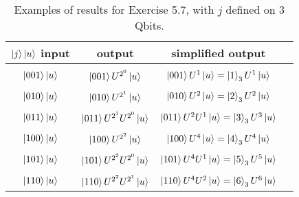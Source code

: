\documentclass{article}
\begin{document}
\begin{enumerate}[label=\textbf{(\arabic*)}]
\begin{table}[th]
    \captionsetup{font=small, width = 14cm}
    \centering
    \begin{tabular}{c|c|c|c}
        $\ket{j}\ket{u}$ input & output & simplified output\\
        \hline\hline
        &&\\[-5pt]
        $\ket{001}\ket{u}$
        & $\ket{001}U^{2^0}\ket{u}$
        & $\ket{001}U^{1}\ket{u} = \ket{1}_3 U^{1}\ket{u}$
        \\[5pt]
        \hline
        &&\\[-5pt]
        $\ket{010}\ket{u}$
        & $\ket{010}U^{2^1}\ket{u}$
        & $\ket{010}U^{2}\ket{u} = \ket{2}_3 U^{2}\ket{u}$
        \\[5pt]
        \hline
        &&\\[-5pt]
        $\ket{011}\ket{u}$
        & $\ket{011}U^{2^1}U^{2^0}\ket{u}$
        & $\ket{011}U^{2}U^{1}\ket{u} = \ket{3}_3 U^{3}\ket{u}$
        \\[5pt]
        \hline
        &&\\[-5pt]
        $\ket{100}\ket{u}$
        & $\ket{100}U^{2^2}\ket{u}$
        & $\ket{100}U^{4}\ket{u} = \ket{4}_3 U^{4}\ket{u}$
        \\[5pt]
        \hline
        &&\\[-5pt]
        $\ket{101}\ket{u}$
        & $\ket{101}U^{2^2}U^{2^0}\ket{u}$
        & $\ket{101}U^{4}U^{1}\ket{u} = \ket{5}_3 U^{5}\ket{u}$
        \\[5pt]
        \hline
        &&\\[-5pt]
        $\ket{110}\ket{u}$
        & $\ket{110}U^{2^2}U^{2^1}\ket{u}$
        & $\ket{110}U^{4}U^{2}\ket{u} = \ket{6}_3 U^{6}\ket{u}$
        \\[5pt]
        \hline
        \end{tabular}
    \caption{Examples of results for Exercise 5.7, with $j$ defined on 3 Qbits.}
    \label{table:Prob_5.7}
\end{table}

\clearpage

\end{enumerate}

\printbibliography
\end{document}
